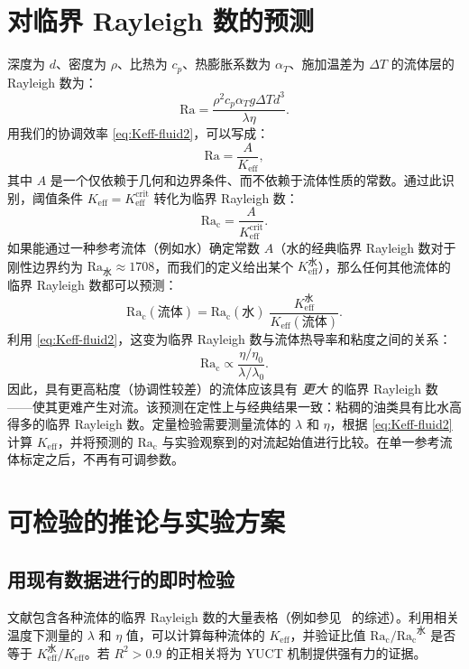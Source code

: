 \documentclass[12pt,a4paper]{article}
\begin{document}
	\section{对临界 Rayleigh 数的预测}
	
	深度为 \(d\)、密度为 \(\rho\)、比热为 \(c_p\)、热膨胀系数为 \(\alpha_T\)、施加温差为 \(\Delta T\) 的流体层的 Rayleigh 数为：
	\begin{equation}
		\mathrm{Ra} = \frac{\rho^2 c_p \alpha_T g \Delta T d^3}{\lambda \eta}.
	\end{equation}
	用我们的协调效率 \eqref{eq:Keff-fluid2}，可以写成：
	\begin{equation}
		\mathrm{Ra} = \frac{A}{K_{\mathrm{eff}}},
	\end{equation}
	其中 \(A\) 是一个仅依赖于几何和边界条件、而不依赖于流体性质的常数。通过此识别，阈值条件 \(K_{\mathrm{eff}} = K_{\mathrm{eff}}^{\mathrm{crit}}\) 转化为临界 Rayleigh 数：
	\begin{equation}\label{eq:Racrit}
		\mathrm{Ra_c} = \frac{A}{K_{\mathrm{eff}}^{\mathrm{crit}}}.
	\end{equation}
	如果能通过一种参考流体（例如水）确定常数 \(A\)（水的经典临界 Rayleigh 数对于刚性边界约为 \(\mathrm{Ra}_{\mathrm{水}} \approx 1708\)，而我们的定义给出某个 \(K_{\mathrm{eff}}^{\mathrm{水}}\)），那么任何其他流体的临界 Rayleigh 数都可以预测：
	\begin{equation}\label{eq:Racrit-predict}
		\boxed{ \mathrm{Ra_c}(\text{流体}) = \mathrm{Ra_c}(\text{水}) \;
			\frac{K_{\mathrm{eff}}^{\mathrm{水}}}{K_{\mathrm{eff}}(\text{流体})} }.
	\end{equation}
	利用 \eqref{eq:Keff-fluid2}，这变为临界 Rayleigh 数与流体热导率和粘度之间的关系：
	\begin{equation}
		\mathrm{Ra_c} \propto \frac{\eta / \eta_0}{\lambda / \lambda_0}.
	\end{equation}
	因此，具有更高粘度（协调性较差）的流体应该具有 \emph{更大} 的临界 Rayleigh 数——使其更难产生对流。该预测在定性上与经典结果一致：粘稠的油类具有比水高得多的临界 Rayleigh 数。定量检验需要测量流体的 \(\lambda\) 和 \(\eta\)，根据 \eqref{eq:Keff-fluid2} 计算 \(K_{\mathrm{eff}}\)，并将预测的 \(\mathrm{Ra_c}\) 与实验观察到的对流起始值进行比较。在单一参考流体标定之后，不再有可调参数。
	
	\section{可检验的推论与实验方案}
	
	\subsection{用现有数据进行的即时检验}
	文献包含各种流体的临界 Rayleigh 数的大量表格（例如参见~\cite{Chandrasekhar1961, Cross1993} 的综述）。利用相关温度下测量的 \(\lambda\) 和 \(\eta\) 值，可以计算每种流体的 \(K_{\mathrm{eff}}\)，并验证比值 \(\mathrm{Ra_c}/\mathrm{Ra_c}^{\mathrm{水}}\) 是否等于 \(K_{\mathrm{eff}}^{\mathrm{水}} / K_{\mathrm{eff}}\)。若 \(R^2 > 0.9\) 的正相关将为 YUCT 机制提供强有力的证据。
	
\end{document}
